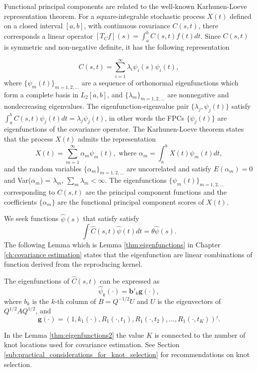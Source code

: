 Functional principal components are related to the well-known Karhunen-Loeve representation theorem. For a square-integrable stochastic process $X(t)$ defined on a closed interval $[a,b]$, with continuous covariance $C(s,t)$, there corresponds a linear operator $[T_Cf](s) = \int_a^bC(s,t)f(t)dt$. Since $C(s,t)$ is symmetric and non-negative definite, it has the following representation 

\begin{equation*}
	C(s,t) = \sum_{i=1}^{\infty}\lambda_i\psi_i(s)\psi_i(t), 
\end{equation*}
where $\{\psi_m(t)\}_{m=1,2,\ldots}$ are a sequence of orthonormal eigenfunctions which form a complete basis in $L_2[a,b]$, and $\{\lambda_m \}_{m=1,2,\ldots}$ are nonnegative and nondecreasing eigenvalues. The eigenfunction-eigenvalue pair $\{\lambda_j, \psi_j(t)\}$ satisfy $\int_a^bC(s,t)\psi_j(t)dt = \lambda_j\psi_j(t)$, in other words the FPCs $\{\psi_j(t)\}$ are eigenfunctions of the covariance operator. The Karhunen-Loeve theorem states that the process $X(t)$ admits the representation 
\begin{equation*}
	X(t) = \sum_{m=1}^{\infty}\alpha_m \psi_m(t), \mbox{ where } \alpha_m = \int_a^b X(t) \psi_m(t)dt, 
\end{equation*}
and the random variables $\{\alpha_m \}_{m=1,2,\ldots}$ are uncorrelated and satisfy $E(\alpha_m)=0$ and Var($\alpha_m$) = $\lambda_m$, $\sum_m \lambda_m < \infty$. The eigenfunctions $\{\psi_m(t)\}_{m=1,2,\ldots}$ corresponding to $C(s,t)$ are the principal component functions and the coefficients $\{\alpha_m \}$ are the functional principal component scores of $X(t)$.

We seek functions $\hat{\psi}(s)$ that satisfy satisfy 
\begin{equation}
	\label{eq:eigenfuns} \int \hat{C}(s,t)\hat{\psi}(t)dt=\theta\hat{\psi}(s). \nonumber
\end{equation}
The following Lemma which is Lemma \ref{thm:eigenfunctions} in Chapter \ref{ch:covariance estimation} states that the eigenfunction are linear combinations of function derived from the reproducing kernel. 
\begin{lemma}
	\label{thm:eigenfunctions2} The eigenfunctions of $\hat{C}(s,t)$ can be expressed as 
	\begin{equation*}
		\hat{\psi}_k(\cdot) = \mathbf{b}'_k\mathbf{g}(\cdot), 
	\end{equation*}
	where $b_k$ is the $k$-th column of $B=Q^{-1/2}U$ and $U$ is the eigenvectors of $Q^{1/2}AQ^{1/2}$, and
	\[ \mathbf{g(\cdot)}=(1, k_1(\cdot),R_{1}(\cdot, t_1),R_{1}(\cdot, t_2),\dots, R_{1}(\cdot, t_K))'. \]
\end{lemma}
In the Lemma \ref{thm:eigenfunctions2} the value $K$ is connected to the number of knot locations used for covariance estimation. See Section \ref{sub:practical_considerations_for_knot_selection} for recommendations on knot selection.


